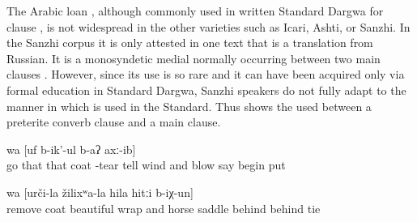 The Arabic loan , although commonly used in written Standard Dargwa for clause  \citep{vandenBerg2004}, is not widespread in the other varieties such as Icari, Ashti, or Sanzhi. In the Sanzhi corpus it is only attested in one text that is a translation from Russian. It is a monosyndetic medial  normally occurring between two main clauses . However, since its use is so rare and it can have been acquired only via formal education in Standard Dargwa, Sanzhi speakers do not fully adapt to the manner in which  is used in the Standard. Thus  shows the  used between a preterite converb clause and a main clause.
%
\begin{exe}
	\ex	\label{ex:‎I will blow at him, I will take his coat off, said the wind and began to blow}
	\gll	[``du	či-b-uq-un-ne	hel-i-j,	hel-i-la	walžaʁ	či-r-sa-jsː-an=da,''	b-urs-ib	č'an-ni]	wa	[uf	b-ik'-ul	b-aʔ	axː-ib]\\
			go	that	that	coat	-tear	tell	wind	and	blow	\tsc{n-}say	begin	put\\
	\glt	{}

	\ex	\label{ex:‎‎‎He took off his coat, put it together well, and tied it to his horse's saddle.}
		wa	[urči-la	žilixʷa-la	hila	hitːi	b-iχ-un]\\
		remove		coat	beautiful	wrap	and	horse\tsc{-gen}	saddle	behind	behind	tie\\
	\glt	{}
\end{exe}

